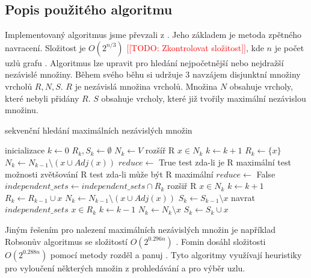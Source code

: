 \documentclass[12pt]{article}
\newcommand{\todo}[1]{\textcolor{red}{[[TODO: #1]]}}
\begin{document}
\subsection{Popis použitého algoritmu}
Implementovaný algoritmus jsme převzali z \cite{demel}. Jeho základem je metoda zpětného navracení. Složitost je \(O(2^{n/3})\) \todo{Zkontrolovat složitost}, kde \(n\) je počet uzlů grafu \cite{tarjan}. Algoritmus lze upravit pro hledání nejpočetnější nebo nejdražší nezávislé množiny. Během svého běhu si udržuje 3 navzájem disjunktní množiny vrcholů \(R, N, S\). \(R\) je nezávislá množina vrcholů. Množina \(N\) obsahuje vrcholy, které nebyli přidány \(R\). \(S\) obsahuje vrcholy, které již tvořily maximální nezávislou množinu.

\begin{algorithm}[H]
\caption{sekvenční hledání maximálních nezávislých množin}
\label{seq_independent_sets}
\begin{algorithmic}
\State \Comment inicializace
\State $k \leftarrow 0$
\State $R_k, S_k \leftarrow \emptyset$
\State $N_k \leftarrow V$
\State \Comment rozšíř R
\State $x \in N_k$
\State $k \leftarrow k+1$
\State $R_k \leftarrow \{x\}$
\State $N_k \leftarrow N_{k-1} \setminus ({x} \cup Adj(x))$
  \State $reduce \leftarrow$ True
  \State \Comment test zda-li je R maximální                           
    \State \Comment test možnosti zvětšování R
      \State \Comment test zda-li může být R maximální
        \State $reduce \leftarrow$ False
      \EndIf    
    \EndIf
  \Else
    \State $independent\_sets \leftarrow independent\_sets \cap {R_k}$
  \EndIf  
    \State \Comment rozšiř R
    \State $x \in N_k$
    \State $k \leftarrow k+1$
    \State $R_k \leftarrow R_{k-1} \cup {x}$    
    \State $N_k \leftarrow N_{k-1} \setminus ({x} \cup Adj(x))$
    \State $S_k \leftarrow S_{k-1} \setminus {x}$
  \Else
    \State \Comment navrat
      \State \Return $independent\_sets$
    \EndIf
    \State $x \in R_k$
    \State $k \leftarrow k - 1$
    \State $N_k \leftarrow N_k \setminus {x}$
    \State $S_k \leftarrow S_k \cup {x}$
  \EndIf
\EndWhile
\EndFunction
\end{algorithmic}
\end{algorithm}

Jiným řešením pro nalezení maximálních nezávislých množin je například Robsonův algoritmus se složitostí \(O(2^{0.296n})\) \cite{robson}. Fomin dosáhl složitosti \(O(2^{0.288n})\) pomocí metody rozděl a panuj \cite{fomin}. Tyto algoritmy využívají heuristiky pro vyloučení některých množin z prohledávání a pro výběr uzlu.  
\end{document}
